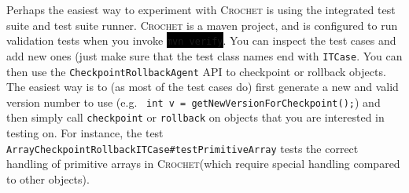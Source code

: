 \documentclass[12pt]{article}
\newcommand{\command}[1]{\colorbox{black}{\texttt{\color{white}#1}}}
\newcommand{\sysname}{\textsc{Crochet}\xspace}
\begin{document}
 
 Perhaps the easiest way to experiment with \sysname is using the integrated test suite and test suite runner. \sysname is a maven project, and is configured to run validation tests when you invoke \command{mvn verify}. You can inspect the test cases and add new ones (just make sure that the test class names end with \texttt{ITCase}. You can then use the \texttt{CheckpointRollbackAgent} API to checkpoint or rollback objects. The easiest way is to (as most of the test cases do) first generate a new and valid version number to use (e.g. \texttt{		int v = getNewVersionForCheckpoint();}) and then simply call \texttt{checkpoint} or \texttt{rollback} on objects that you are interested in testing on. For instance, the test \texttt{ArrayCheckpointRollbackITCase\#testPrimitiveArray} tests the correct handling of primitive arrays in \sysname (which require special handling compared to other objects).
 
\end{document}
